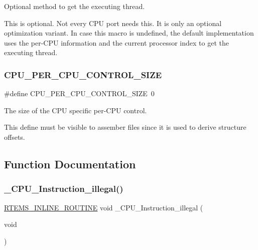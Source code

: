 Optional method to get the executing thread. 

This is optional. Not every C\+PU port needs this. It is only an optional optimization variant. In case this macro is undefined, the default implementation uses the per-\/\+C\+PU information and the current processor index to get the executing thread. \mbox{\label{group__RTEMSScoreCPUExample_gaf8e38596ad3db49995fd8eb9fb4e86b2}} 
\subsubsection{\texorpdfstring{CPU\_PER\_CPU\_CONTROL\_SIZE}{CPU\_PER\_CPU\_CONTROL\_SIZE}}
{\footnotesize\ttfamily \#define C\+P\+U\+\_\+\+P\+E\+R\+\_\+\+C\+P\+U\+\_\+\+C\+O\+N\+T\+R\+O\+L\+\_\+\+S\+I\+ZE~0}



The size of the C\+PU specific per-\/\+C\+PU control. 

This define must be visible to assember files since it is used to derive structure offsets. 

\subsection{Function Documentation}
\mbox{\label{group__RTEMSScoreCPUExample_ga07618c93359f2485af2e98a96b330208}} 
\subsubsection{\texorpdfstring{\_CPU\_Instruction\_illegal()}{\_CPU\_Instruction\_illegal()}}
{\footnotesize\ttfamily \mbox{\hyperlink{group__RTEMSScoreBaseDefs_gac216239df231d5dbd15e3520b0b9313f}{R\+T\+E\+M\+S\+\_\+\+I\+N\+L\+I\+N\+E\+\_\+\+R\+O\+U\+T\+I\+NE}} void \+\_\+\+C\+P\+U\+\_\+\+Instruction\+\_\+illegal (\begin{DoxyParamCaption}\item[{void}]{ }\end{DoxyParamCaption})}




